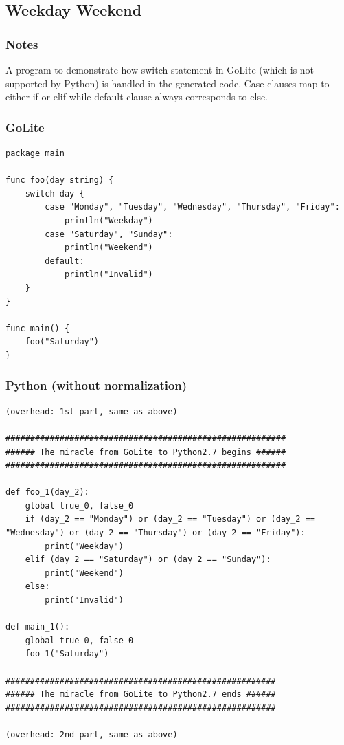 \documentclass{article}
\begin{document}
\subsection{Weekday Weekend}
\subsubsection{Notes}
A program to demonstrate how switch statement in GoLite (which is not
supported by Python) is handled in the generated code. Case clauses map
to either if or elif while default clause always corresponds to else.

\subsubsection{GoLite}
\begin{lstlisting}
package main

func foo(day string) {
    switch day {
        case "Monday", "Tuesday", "Wednesday", "Thursday", "Friday":
            println("Weekday")
        case "Saturday", "Sunday":
            println("Weekend")
        default:
            println("Invalid")
    }
}

func main() {
    foo("Saturday")
}

\end{lstlisting}
\subsubsection{Python (without normalization)}
\begin{lstlisting}
(overhead: 1st-part, same as above)

#########################################################
###### The miracle from GoLite to Python2.7 begins ######
#########################################################

def foo_1(day_2):
	global true_0, false_0
	if (day_2 == "Monday") or (day_2 == "Tuesday") or (day_2 == "Wednesday") or (day_2 == "Thursday") or (day_2 == "Friday"):
		print("Weekday")
	elif (day_2 == "Saturday") or (day_2 == "Sunday"):
		print("Weekend")
	else:
		print("Invalid")

def main_1():
	global true_0, false_0
	foo_1("Saturday")

#######################################################
###### The miracle from GoLite to Python2.7 ends ######
#######################################################

(overhead: 2nd-part, same as above)
\end{lstlisting}
\end{document}
